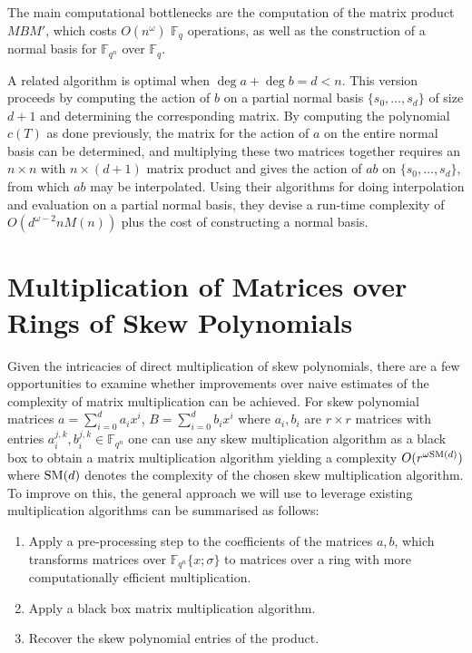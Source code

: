 \documentclass[9pt]{article}
\theoremstyle{plain}
\theoremstyle{definition}
\theoremstyle{remark}
\newcommand{\F}{\mathbb{F}}
\renewcommand{\L}{\F_{q^n}}
\begin{document}
The main computational bottlenecks are the computation of the matrix product $MBM'$, which costs $O(n^{\omega})$ $\F_q$ operations, as well as the construction of a normal basis for $\L$ over $\F_q$.

A related algorithm is optimal when $\deg a + \deg b = d < n$. This version proceeds by computing the action of $b$ on a partial normal basis $\{s_0, \ldots, s_d \}$ of size $d + 1$ and determining the corresponding matrix. By computing the polynomial $c(T)$ as done previously, the matrix for the action of $a$ on the entire normal basis can be determined, and multiplying these two matrices together requires an $n\times n$ with $n\times (d+1)$ matrix product and gives the action of $ab$ on $\{s_0, \ldots, s_d\}$, from which $ab$ may be interpolated. Using their algorithms for doing interpolation and evaluation on a partial normal basis, they devise a run-time complexity of $O(d^{\omega - 2} nM(n))$ plus the cost of constructing a normal basis. 


\section{Multiplication of Matrices over Rings of Skew Polynomials}

Given the intricacies of direct multiplication of skew polynomials, there are a few opportunities to examine whether improvements over naive estimates of the complexity of matrix multiplication can be achieved. For skew polynomial matrices $ a = \sum_{i=0}^{d} a_i x^i $, $ B = \sum_{i=0}^{d} b_i x^i $ where $a_i, b_i$ are $r \times r$ matrices with entries $a_i^{j,k}, b_i^{j,k} \in \F_{q^n}$ one can use any skew multiplication algorithm as a black box to obtain a matrix multiplication algorithm yielding a complexity $O(r^{\omega \textnormal{SM}(d)})$ where $\textnormal{SM}(d)$ denotes the complexity of the chosen skew multiplication algorithm. To improve on this, the general approach we will use to leverage existing multiplication algorithms can be summarised as follows:

\begin{enumerate}
    \item Apply a pre-processing step to the coefficients of the matrices $a, b$, which transforms matrices over $\F_{q^n}\{x; \sigma\}$ to matrices over a ring with more computationally efficient multiplication.
    \item Apply a black box matrix multiplication algorithm. 
    \item Recover the skew polynomial entries of the product.
\end{enumerate}
\end{document}
